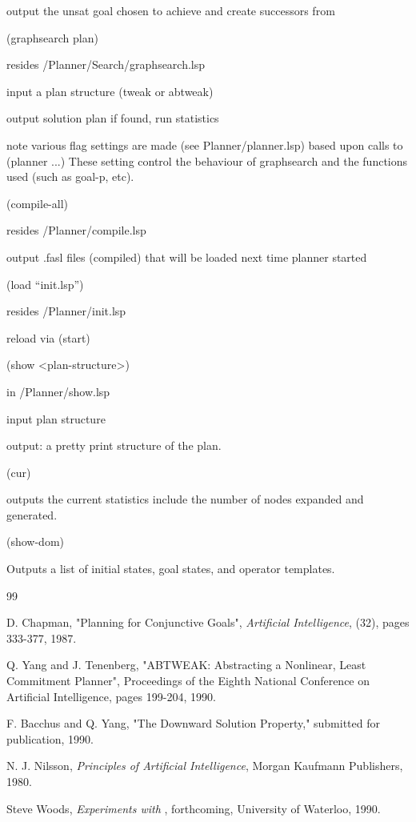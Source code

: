 \begin{description}
 output  the unsat goal chosen to achieve and create successors from

\item[GRAPHSEARCH]
(graphsearch plan)

 resides /Planner/Search/graphsearch.lsp

 input   a plan structure (tweak or abtweak) 

 output  solution plan if found, run statistics

 note    various flag settings are made (see Planner/planner.lsp) based upon 
         calls to (planner ...)  These setting control the behaviour of
         graphsearch and the functions used (such as goal-p, etc).

\item[COMPILE]
(compile-all)

 resides /Planner/compile.lsp

 output  .fasl files (compiled) that will be loaded next time planner started

\item[LOAD]

(load ``init.lsp'')

 resides /Planner/init.lsp

 reload via (start)

\item[SHOW Plan]
(show <plan-structure>)

in /Planner/show.lsp

input plan structure

output: a pretty print structure of the plan.

\item[Statistics So Far]
(cur)

outputs the current statistics include the number of nodes expanded and generated.

\item[Show Domain]
(show-dom)

Outputs a list of initial states, goal states, and operator templates.

\end{description}

\begin{thebibliography}{99}

D. Chapman,  "Planning for Conjunctive Goals",
{\em Artificial Intelligence},  (32), pages 333-377, 1987.

Q. Yang and J. Tenenberg,
"ABTWEAK: Abstracting a Nonlinear, Least Commitment Planner",
Proceedings of the Eighth National Conference on Artificial
Intelligence, pages 199-204, 1990.

F. Bacchus and Q. Yang, "The Downward Solution Property,"
submitted for publication, 1990.

N. J. Nilsson, {\em Principles of Artificial Intelligence}, 
Morgan Kaufmann Publishers, 1980.


Steve Woods, {\em Experiments with \abtweak}, forthcoming, 
University of Waterloo, 1990.

\end{thebibliography}


